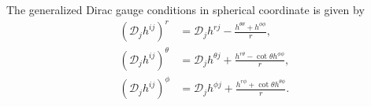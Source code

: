 The generalized Dirac gauge conditions in spherical coordinate is given by
\begin{align}
    \left(\mathcal{D}_j h^{ij}\right)^r &= \mathcal{D}_j h^{rj} - \frac{h^{\theta\theta}+h^{\phi\phi}}{r}, \\
    \left(\mathcal{D}_j h^{ij}\right)^\theta &= \mathcal{D}_j h^{\theta j} + \frac{h^{r\theta} - \cot\theta h^{\phi\phi}}{r}, \\
    \left(\mathcal{D}_j h^{ij}\right)^\phi &= \mathcal{D}_j h^{\phi j} + \frac{h^{r\phi} + \cot\theta h^{\theta\phi}}{r}.
\end{align}
